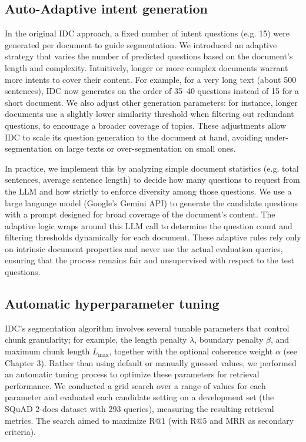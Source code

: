 \documentclass[12pt,a4paper]{report}
\begin{document}
\subsection{Auto-Adaptive intent generation}

In the original IDC approach, a fixed number of intent questions (e.g. 15) were generated per document to guide segmentation. We introduced an adaptive strategy that varies the number of predicted questions based on the document's length and complexity. Intuitively, longer or more complex documents warrant more intents to cover their content. For example, for a very long text (about 500 sentences), IDC now generates on the order of 35--40 questions instead of 15 for a short document. We also adjust other generation parameters: for instance, longer documents use a slightly lower similarity threshold when filtering out redundant questions, to encourage a broader coverage of topics. These adjustments allow IDC to scale its question generation to the document at hand, avoiding under-segmentation on large texts or over-segmentation on small ones. 

In practice, we implement this by analyzing simple document statistics (e.g. total sentences, average sentence length) to decide how many questions to request from the LLM and how strictly to enforce diversity among those questions. We use a large language model (Google's Gemini API) to generate the candidate questions with a prompt designed for broad coverage of the document's content. The adaptive logic wraps around this LLM call to determine the question count and filtering thresholds dynamically for each document. These adaptive rules rely only on intrinsic document properties and never use the actual evaluation queries, ensuring that the process remains fair and unsupervised with respect to the test questions.

\subsection{Automatic hyperparameter tuning}

IDC's segmentation algorithm involves several tunable parameters that control chunk granularity; for example, the length penalty $\lambda$, boundary penalty $\beta$, and maximum chunk length $L_{\max}$, together with the optional coherence weight $\alpha$ (see Chapter 3). Rather than using default or manually guessed values, we performed an automatic tuning process to optimize these parameters for retrieval performance. We conducted a grid search over a range of values for each parameter and evaluated each candidate setting on a development set (the SQuAD 2-docs dataset with 293 queries), measuring the resulting retrieval metrics. The search aimed to maximize R@1 (with R@5 and MRR as secondary criteria). 
\end{document}
